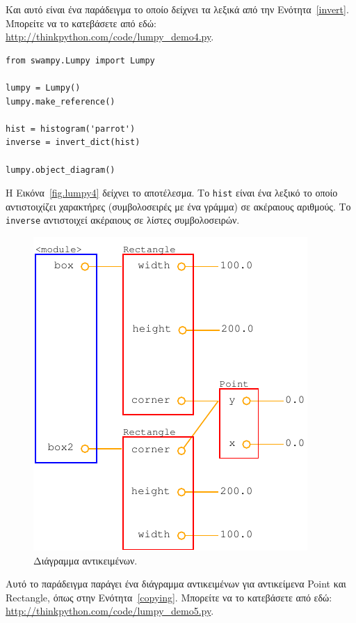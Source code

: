 \documentclass[10pt]{book}
\begin{document}
Και αυτό είναι ένα παράδειγμα το οποίο δείχνει τα λεξικά από την Ενότητα~\ref{invert}.  Μπορείτε να το
κατεβάσετε από εδώ: \url{http://thinkpython.com/code/lumpy_demo4.py}.

\begin{verbatim}
from swampy.Lumpy import Lumpy

lumpy = Lumpy()
lumpy.make_reference()

hist = histogram('parrot')
inverse = invert_dict(hist)

lumpy.object_diagram()
\end{verbatim}

Η Εικόνα~\ref{fig.lumpy4} δείχνει το αποτέλεσμα.  Το {\tt hist} είναι ένα λεξικό το οποίο αντιστοιχίζει
χαρακτήρες (συμβολοσειρές με ένα γράμμα) σε ακέραιους αριθμούς.  Το {\tt inverse} αντιστοιχεί ακέραιους
σε λίστες συμβολοσειρών.

\begin{figure}
\centerline
{\includegraphics[scale=0.7]{figs/lumpydemo5.pdf}}
\caption{Διάγραμμα αντικειμένων.}
\label{fig.lumpy5}
\end{figure}

Αυτό το παράδειγμα παράγει ένα διάγραμμα αντικειμένων για αντικείμενα Point και Rectangle, όπως στην
Ενότητα~\ref{copying}.  Μπορείτε να το κατεβάσετε από εδώ: \url{http://thinkpython.com/code/lumpy_demo5.py}.
\end{document}
